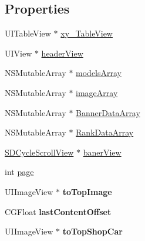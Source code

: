 \subsection*{Properties}
\begin{DoxyCompactItemize}
\item 
U\+I\+Table\+View $\ast$ \mbox{\hyperlink{category_featured_view_controller_07_08_ae5287b78b9131b8d773127ba13ba395a}{xy\+\_\+\+Table\+View}}
\item 
U\+I\+View $\ast$ \mbox{\hyperlink{category_featured_view_controller_07_08_a02aba8a8796c7bb2fc8832f063cb0636}{header\+View}}
\item 
N\+S\+Mutable\+Array $\ast$ \mbox{\hyperlink{category_featured_view_controller_07_08_a7562a4b5751829f39eda36312763155b}{models\+Array}}
\item 
N\+S\+Mutable\+Array $\ast$ \mbox{\hyperlink{category_featured_view_controller_07_08_a667438873b22b54b187565f71ad44ea9}{image\+Array}}
\item 
N\+S\+Mutable\+Array $\ast$ \mbox{\hyperlink{category_featured_view_controller_07_08_ae39b396ecab83e331c08aee7782f486f}{Banner\+Data\+Array}}
\item 
N\+S\+Mutable\+Array $\ast$ \mbox{\hyperlink{category_featured_view_controller_07_08_ab0b07a1ab93014f53979140b2049a179}{Rank\+Data\+Array}}
\item 
\mbox{\hyperlink{interface_s_d_cycle_scroll_view}{S\+D\+Cycle\+Scroll\+View}} $\ast$ \mbox{\hyperlink{category_featured_view_controller_07_08_a2b82518a5d8ed139d2e5436a9032c81f}{baner\+View}}
\item 
int \mbox{\hyperlink{category_featured_view_controller_07_08_a66528417128de9601c319ae36e7d4769}{page}}
\item 
\mbox{\label{category_featured_view_controller_07_08_a6e7008766425a3214047c5c31b2e4ff1}} 
U\+I\+Image\+View $\ast$ {\bfseries to\+Top\+Image}
\item 
\mbox{\label{category_featured_view_controller_07_08_adad4b38a008a64df86643e13911b63db}} 
C\+G\+Float {\bfseries last\+Content\+Offset}
\item 
\mbox{\label{category_featured_view_controller_07_08_ae260c8ae7a64f1ef9864d7a611c14092}} 
U\+I\+Image\+View $\ast$ {\bfseries to\+Top\+Shop\+Car}
\end{DoxyCompactItemize}



